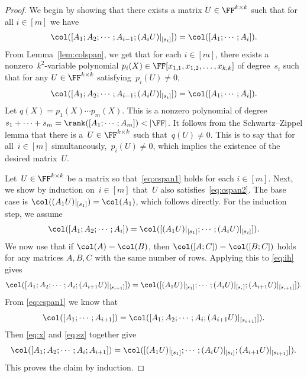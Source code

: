 \begin{proof}
We begin by showing that there exists a matrix $U \in \FF^{k \times k}$ such that for all $i \in [m]$ we have 
\begin{equation}\label{eq:cspan1}
    \col([A_1 ; A_2 ; \cdots ; A_{i-1} ; (A_i U)|_{[s_i]}]) = \col([A_1; \cdots ; A_i]).
\end{equation}
From Lemma~\ref{lem:colspan}, we get that for each $i\in [m]$, there exists a nonzero~$k^2$-variable polynomial $p_i(X)\in \FF[x_{1,1},x_{1,2},\dots,x_{k,k}]$ of degree~$s_i$ such that for any $U\in \FF^{k\times k}$ satisfying~$p_i(U)\ne 0$,
\[
    \col([A_1 ; A_2 ; \cdots ; A_{i-1} ; (A_i U)|_{[s_i]}]) = \col([A_1; \cdots ; A_i]).
    \]
Let $q(X)=  p_1(X)\cdots p_m(X)$.
This is a nonzero polynomial of degree $s_1 + \cdots +s_m = \rank([A_1; \cdots; A_m])<|\FF|$.
It follows from the Schwartz--Zippel lemma \cite{DEMILLO1978193, schwartz1980fast, zippel1979probabilistic} that there is a~$U\in \FF^{k\times k}$ such that~$q(U) \ne 0$.
This is to say that for all~$i\in[m]$ simultaneously,~$p_i(U)\ne 0$, which implies the existence of the desired matrix~$U$.

Let~$U\in \FF^{k\times k}$ be a matrix so that~\eqref{eq:cspan1} holds for each $i\in [m]$.
Next, we show by induction on~$i\in[m]$ that~$U$ also satisfies~\eqref{eq:cspan2}.
The base case is $\col((A_1 U)|_{[s_1]}) = \col(A_1)$,
which follows directly.
For the induction step, we assume
\begin{equation}\label{eq:ih}
    \col([A_1 ; A_2 ; \cdots ; A_i]) = \col([(A_1U)|_{[s_1]} ; \cdots ; (A_iU)|_{[s_i]}]).
\end{equation}
We now use that if $\col(A) = \col(B)$, then $\col([A ; C]) = \col([B;C])$ holds for any matrices $A,B,C$ with the same number of rows. Applying this to \eqref{eq:ih} gives
\begin{equation}\label{eq:x}
    \col([A_1 ; A_2 ; \cdots ; A_i; (A_{i+1} U)|_{[s_{i+1}]}]) = \col([(A_1U)|_{[s_1]} ; \cdots ; (A_iU)|_{[s_i]}; (A_{i+1} U)|_{[s_{i+1}]}]).
\end{equation}
From \eqref{eq:cspan1} we know that 
\begin{equation}\label{eq:sz}
    \col([A_1; \cdots ; A_{i+1}]) = \col([A_1 ; A_2 ; \cdots ; A_i ; (A_{i+1} U)|_{[s_{i+1}]}]).
\end{equation}
%
%
Then \eqref{eq:x} and \eqref{eq:sz} together give
    \[
    \col([A_1 ; A_2 ; \cdots ; A_i; A_{i+1}]) = \col([(A_1U)|_{[s_1]} ; \cdots ; (A_iU)|_{[s_i]}; (A_{i+1}U)|_{[s_{i+1}]}]).
    \]
This proves the claim by induction.
\end{proof}



